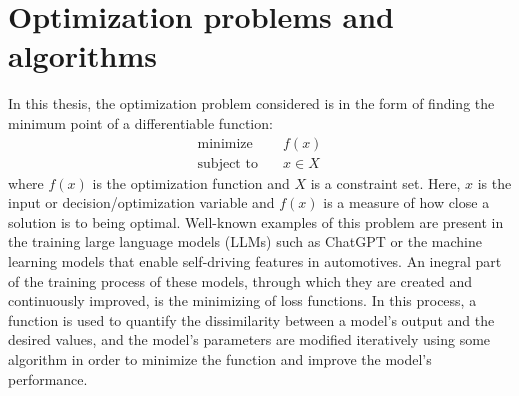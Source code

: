\section{Optimization problems and algorithms} \label{OpPro}

In this thesis, the optimization problem considered is in the form of finding the minimum point of a differentiable function:
\begin{subequations}\label{opt prob}
  \begin{align*}
    \textrm{minimize} &\quad f(x) \\
    \textrm{subject to} &\quad x \in X
  \end{align*}
\end{subequations}
where \(f(x)\) is the optimization function and \(X\) is a constraint set. Here, \(x\) is the input or decision/optimization variable and \(f(x)\) is a measure of how close a solution is to being optimal. Well-known examples of this problem are present in the training large language models (LLMs) such as ChatGPT or the machine learning models that enable self-driving features in automotives. An inegral part of the training process of these models, through which they are created and continuously improved, is the minimizing of loss functions. In this process, a function is used to quantify the dissimilarity between a model's output and the desired values, and the model's parameters are modified iteratively using some algorithm in order to minimize the function and improve the model's performance.

